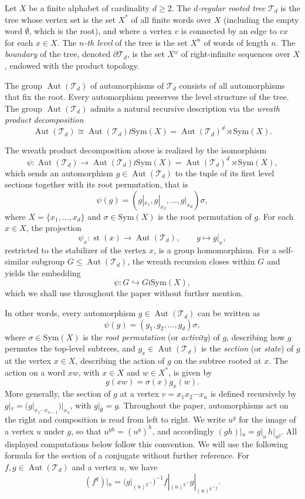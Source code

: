 \documentclass[11pt,leqno]{amsart}
\theoremstyle{plain}
\newcommand\T{{\mathcal{T}}}
\DeclareMathOperator{\Aut}{Aut}
\newcommand{\Sym}{\mathrm{Sym}}
\DeclareMathOperator{\st}{st}
\numberwithin{equation}{section}
\begin{document}
Let $X$ be a finite alphabet of cardinality $d \geq 2$. The \emph{$d$-regular rooted tree} $\T_d$ is the tree whose vertex set is the set $X^*$ of all finite words over $X$ (including the empty word $\emptyset$, which is the root), and where a vertex $v$ is connected by an edge to $vx$ for each $x \in X$. The \emph{$n$-th level} of the tree is the set $X^n$ of words of length $n$. The \emph{boundary} of the tree, denoted $\partial \T_d$, is the set $X^\omega$ of right-infinite sequences over $X$, endowed with the product topology.

The group $\Aut(\T_d)$ of automorphisms of $\T_d$ consists of all  automorphisms that fix the root. Every automorphism preserves the level structure of the tree. The group $\Aut(\T_d)$ admits a natural recursive description via the \emph{wreath product decomposition}
\[
  \Aut(\T_d) \cong \Aut(\T_d) \wr \Sym(X) = \Aut(\T_d)^d \rtimes \Sym(X).
\]

The wreath product decomposition above is realized by the isomorphism
\[
  \psi\colon \Aut(\T_d) \longrightarrow  \Aut(\T_d)\wr \Sym(X)=\Aut(\T_d)^d\rtimes \Sym(X),
\]
which sends an automorphism $g\in \Aut(\T_d)$ to the tuple of its first level sections together with its root permutation, that is
\[
  \psi(g)=(g|_{x_1},g|_{x_2},\ldots,g|_{x_d}) \sigma,
\]
where $X=\{x_1,\ldots,x_d\}$ and $\sigma\in \Sym(X)$ is the root permutation of $g$. For each $x\in X$, the projection
\[
  \psi_x\colon \st(x) \longrightarrow  \Aut(\T_d),\qquad g \longmapsto  g|_x,
\]
restricted to the stabilizer of the vertex $x$, is a group homomorphism. For a self-similar subgroup $G\leq \Aut(\T_d)$, the wreath recursion closes within $G$ and yields the embedding
\[
  \psi\colon G \hookrightarrow  G\wr \Sym(X),
\]
which we shall use throughout the paper without further mention.

In other words, every automorphism $g \in \Aut(\T_d)$ can be written as
\[
  \psi(g) = (g_1, g_2, \ldots, g_d)\sigma,
\]
where $\sigma \in \Sym(X)$ is the \emph{root permutation} (or \emph{activity}) of $g$, describing how $g$ permutes the top-level subtrees, and $g_x \in \Aut(\T_d)$ is the \emph{section} (or \emph{state}) of $g$ at the vertex $x \in X$, describing the action of $g$ on the subtree rooted at $x$. The action on a word $xw$, with $x \in X$ and $w \in X^*$, is given by
\[
  g(xw) = \sigma(x)  g_x(w).
\]
More generally, the section of $g$ at a vertex $v = x_1 x_2 \cdots x_n$ is defined recursively by $g|_v = (g|_{x_1 \cdots x_{n-1}})|_{x_n}$, with $g|_\emptyset = g$.
Throughout the paper, automorphisms act on the right and composition is read from  left to right. We write $u^g$ for the image of a vertex $u$ under $g$, so that $u^{gh}=(u^g)^h$, and accordingly $(gh)|_u=g|_u\, h|_{u^g}$. All displayed computations below follow this convention.
We will use the following formula for the section of a conjugate without further reference. For $f,g\in  \Aut(\T_d)$ and a vertex $u$, we have
\begin{equation}
    (f^{g})|_{u}=(g|_{(u)^{g^{-1}}})^{-1}f|_{(u)^{g^{-1}}}g|_{(u)^{g^{-1}f}}.
\end{equation}
\end{document}
